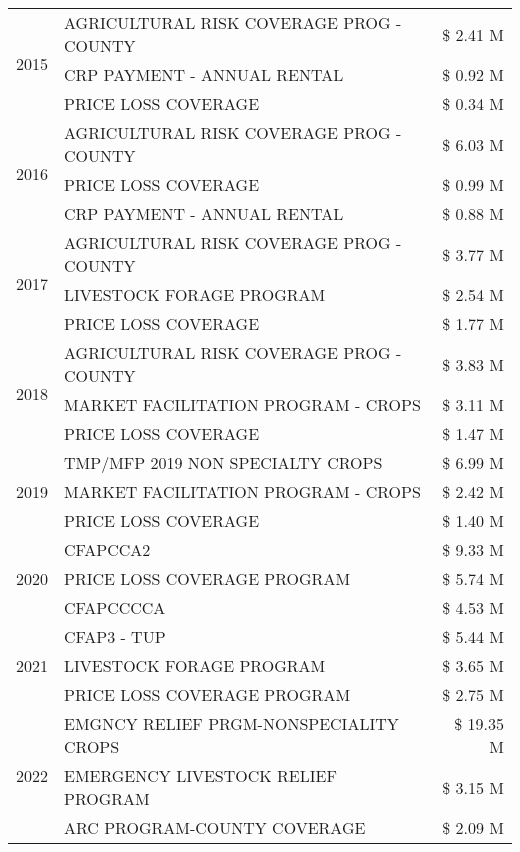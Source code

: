 \begin{tabular}{llr}
\cline{1-3}
\multirow[t]{3}{*}{2015} & AGRICULTURAL RISK COVERAGE PROG - COUNTY & \$ 2.41 M \\
 & CRP PAYMENT - ANNUAL RENTAL & \$ 0.92 M \\
 & PRICE LOSS COVERAGE & \$ 0.34 M \\
\cline{1-3}
\multirow[t]{3}{*}{2016} & AGRICULTURAL RISK COVERAGE PROG - COUNTY & \$ 6.03 M \\
 & PRICE LOSS COVERAGE & \$ 0.99 M \\
 & CRP PAYMENT - ANNUAL RENTAL & \$ 0.88 M \\
\cline{1-3}
\multirow[t]{3}{*}{2017} & AGRICULTURAL RISK COVERAGE PROG - COUNTY & \$ 3.77 M \\
 & LIVESTOCK FORAGE PROGRAM & \$ 2.54 M \\
 & PRICE LOSS COVERAGE & \$ 1.77 M \\
\cline{1-3}
\multirow[t]{3}{*}{2018} & AGRICULTURAL RISK COVERAGE PROG - COUNTY & \$ 3.83 M \\
 & MARKET FACILITATION PROGRAM - CROPS & \$ 3.11 M \\
 & PRICE LOSS COVERAGE & \$ 1.47 M \\
\cline{1-3}
\multirow[t]{3}{*}{2019} & TMP/MFP 2019 NON SPECIALTY CROPS & \$ 6.99 M \\
 & MARKET FACILITATION PROGRAM - CROPS & \$ 2.42 M \\
 & PRICE LOSS COVERAGE & \$ 1.40 M \\
\cline{1-3}
\multirow[t]{3}{*}{2020} & CFAPCCA2 & \$ 9.33 M \\
 & PRICE LOSS COVERAGE PROGRAM & \$ 5.74 M \\
 & CFAPCCCCA & \$ 4.53 M \\
\cline{1-3}
\multirow[t]{3}{*}{2021} & CFAP3 - TUP & \$ 5.44 M \\
 & LIVESTOCK FORAGE PROGRAM & \$ 3.65 M \\
 & PRICE LOSS COVERAGE PROGRAM & \$ 2.75 M \\
\cline{1-3}
\multirow[t]{3}{*}{2022} & EMGNCY RELIEF PRGM-NONSPECIALITY CROPS & \$ 19.35 M \\
 & EMERGENCY LIVESTOCK RELIEF PROGRAM & \$ 3.15 M \\
 & ARC PROGRAM-COUNTY COVERAGE & \$ 2.09 M \\
\cline{1-3}
\bottomrule
\end{tabular}
